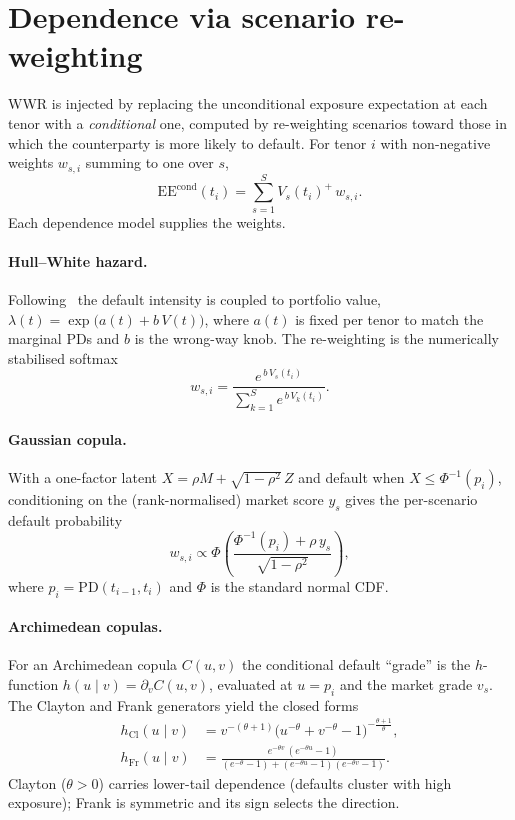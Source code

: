 \documentclass[twocolumn,10pt]{article}
\newcommand{\PD}{\mathrm{PD}}
\newcommand{\EE}{\mathrm{EE}}
\begin{document}
\section{Dependence via scenario re-weighting}\label{sec:dep}
WWR is injected by replacing the unconditional exposure expectation at each
tenor with a \emph{conditional} one, computed by re-weighting scenarios toward
those in which the counterparty is more likely to default. For tenor $i$ with
non-negative weights $w_{s,i}$ summing to one over $s$,
\begin{equation}\label{eq:condee}
\EE^{\mathrm{cond}}(t_i)=\sum_{s=1}^{S} V_s(t_i)^{+}\,w_{s,i}.
\end{equation}
Each dependence model supplies the weights.

\paragraph{Hull--White hazard.} Following~\cite{hullwhite2012} the default
intensity is coupled to portfolio value,
$\lambda(t)=\exp\!\big(a(t)+b\,V(t)\big)$, where $a(t)$ is fixed per tenor to
match the marginal PDs and $b$ is the wrong-way knob. The re-weighting is the
numerically stabilised softmax
\begin{equation}\label{eq:hwweights}
w_{s,i}=\frac{e^{\,b\,V_s(t_i)}}{\sum_{k=1}^{S} e^{\,b\,V_k(t_i)}}.
\end{equation}

\paragraph{Gaussian copula.} With a one-factor latent
$X=\rho M+\sqrt{1-\rho^2}\,Z$ and default when $X\le\Phi^{-1}(p_i)$, conditioning
on the (rank-normalised) market score $y_s$ gives the per-scenario default
probability
\begin{equation}\label{eq:gauss}
w_{s,i}\propto
\Phi\!\left(\frac{\Phi^{-1}(p_i)+\rho\,y_s}{\sqrt{1-\rho^2}}\right),
\end{equation}
where $p_i=\PD(t_{i-1},t_i)$ and $\Phi$ is the standard normal CDF.

\paragraph{Archimedean copulas.} For an Archimedean copula $C(u,v)$ the
conditional default ``grade'' is the $h$-function $h(u\mid v)=\partial_v C(u,v)$,
evaluated at $u=p_i$ and the market grade $v_s$. The Clayton and Frank
generators yield the closed forms
\begin{align}
h_{\text{Cl}}(u\mid v)&=v^{-(\theta+1)}\big(u^{-\theta}+v^{-\theta}-1\big)^{-\frac{\theta+1}{\theta}},
\label{eq:clayton}\\
h_{\text{Fr}}(u\mid v)&=\frac{e^{-\theta v}\,(e^{-\theta u}-1)}
{(e^{-\theta}-1)+(e^{-\theta u}-1)(e^{-\theta v}-1)}.
\label{eq:frank}
\end{align}
Clayton ($\theta>0$) carries lower-tail dependence (defaults cluster with high
exposure); Frank is symmetric and its sign selects the direction.
\end{document}
